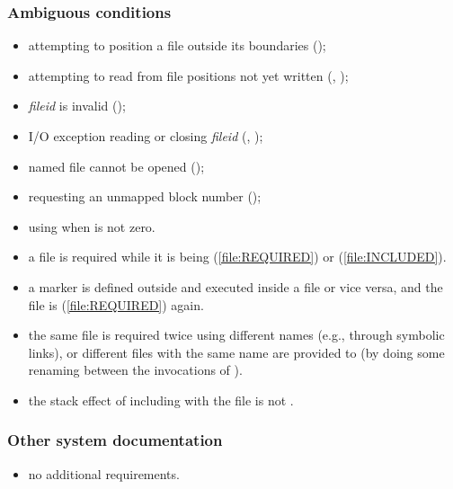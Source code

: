 \subsubsection{Ambiguous conditions} %
\begin{itemize}
\item attempting to position a file outside its boundaries
	();
\item attempting to read from file positions not yet written
	(, );
\item \emph{fileid} is invalid ();
\item I/O exception reading or closing \emph{fileid}
	(,
	 );
\item named file cannot be opened
	();
\item requesting an unmapped block number
	();
\item using  when
	 is not zero.


\item a file is required while it is being 
	(\ref{file:REQUIRED}) or  (\ref{file:INCLUDED}).
\item a marker is defined outside and executed inside a file or
	vice versa, and the file is 
	(\ref{file:REQUIRED}) again.
\item the same file is required twice using different names
	(e.g., through symbolic links), or different files with the
	same name are provided to  (by doing
	some renaming between the invocations of ).
\item the stack effect of including with
	 the file is not .

\end{itemize}

\subsubsection{Other system documentation} %
\begin{itemize}
\item no additional requirements.
\end{itemize}

